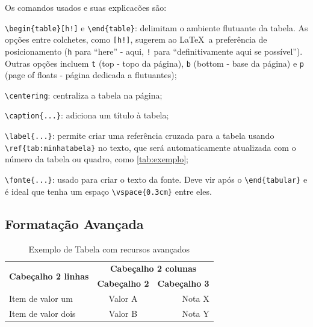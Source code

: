 Os comandos usados e suas explicacões são:
\begin{alineas}
	\item \texttt{\textbackslash begin\{table\}[h!]} e \texttt{\textbackslash end\{table\}}: delimitam o ambiente flutuante da tabela. As opções entre colchetes, como \texttt{[h!]}, sugerem ao \LaTeX\  a preferência de posicionamento (\texttt{h} para ``here'' - aqui, \texttt{!} para ``definitivamente aqui se possível''). Outras opções incluem \texttt{t} (top - topo da página), \texttt{b} (bottom - base da página) e \texttt{p} (page of floats - página dedicada a flutuantes);
	\item \texttt{\textbackslash centering}: centraliza a tabela na página;
	\item \texttt{\textbackslash caption\{...\}}: adiciona um título à tabela;
	\item \texttt{\textbackslash label\{...\}}: permite criar uma referência cruzada para a tabela usando\\ \texttt{\textbackslash ref\{tab:minhatabela\}} no texto, que será automaticamente atualizada com o número da tabela ou quadro, como \autoref{tab:exemplo};
	\item \texttt{\textbackslash fonte\{...\}}: usado para criar o texto da fonte. Deve vir após o \texttt{\textbackslash end\{tabular\}} e é ideal que tenha um espaço \texttt{\textbackslash vspace\{0.3cm\}} entre eles.
\end{alineas}

\subsection{Formatação Avançada}

\begin{table}[h!]
	\centering
	\caption{Exemplo de Tabela com recursos avançados}\label{tab:exemploAvan}
	\renewcommand{\arraystretch}{2.0} %
	\setlength{\tabcolsep}{2ex} %
	\begin{tabular}{m{2.5cm} c r}
		\hline
		\multirow{2}{2.5cm}{\bf Cabeçalho 2 linhas} & \multicolumn{2}{|c}{\bf Cabeçalho 2 colunas}\\
		\cline{2-3}
		& \multicolumn{1}{|c|}{\bf Cabeçalho 2} & \bf Cabeçalho 3 \\
		\hline
		Item de valor um & Valor A & Nota X \\
		Item de valor dois & Valor B & Nota Y \\
		\hline
	\end{tabular}
	
	\vspace{.3cm}
\end{table}

